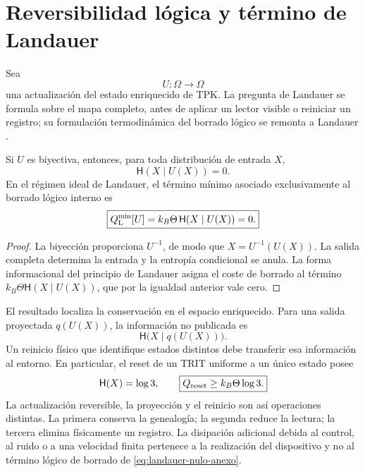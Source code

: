 \section{Reversibilidad lógica y término de Landauer}

Sea
\[
 U:\Omega\longrightarrow\Omega
\]
una actualización del estado enriquecido de TPK. La pregunta de Landauer se
formula sobre el mapa completo, antes de aplicar un lector visible o reiniciar
un registro; su formulación termodinámica del borrado lógico se remonta a
Landauer \cite{Landauer1961}.

\begin{theorem}
\label{thm:landauer-nulo-tpk-anexo}
Si \(U\) es biyectiva, entonces, para toda distribución de entrada \(X\),
\begin{equation}
 \mathsf H(X\mid U(X))=0.
 \label{eq:landauer-entropia-cero-anexo}
\end{equation}
En el régimen ideal de Landauer, el término mínimo asociado exclusivamente al
borrado lógico interno es
\begin{equation}
 \boxed{
 Q_{\rm L}^{\min}[U]
 =k_B\Theta\,\mathsf H(X\mid U(X))=0.}
 \label{eq:landauer-nulo-anexo}
\end{equation}
\end{theorem}

\begin{proof}
La biyección proporciona \(U^{-1}\), de modo que
\(X=U^{-1}(U(X))\). La salida completa determina la entrada y la entropía
condicional se anula. La forma informacional del principio de Landauer asigna
el coste de borrado al término \(k_B\Theta\mathsf H(X\mid U(X))\), que por la
igualdad anterior vale cero.
\end{proof}

El resultado localiza la conservación en el espacio enriquecido. Para una
salida proyectada \(q(U(X))\), la información no publicada es
\begin{equation}
 \mathsf H\bigl(X\mid q(U(X))\bigr).
 \label{eq:informacion-proyeccion-anexo}
\end{equation}
Un reinicio físico que identifique estados distintos debe transferir esa
información al entorno. En particular, el reset de un TRIT uniforme a un único
estado posee
\[
 \mathsf H(X)=\log3,
 \qquad
 \boxed{Q_{\rm reset}\geq k_B\Theta\log3.}
\]
La actualización reversible, la proyección y el reinicio son así operaciones
distintas. La primera conserva la genealogía; la segunda reduce la lectura; la
tercera elimina físicamente un registro. La disipación adicional debida al
control, al ruido o a una velocidad finita pertenece a la realización del
dispositivo y no al término lógico de borrado de
\eqref{eq:landauer-nulo-anexo}.

